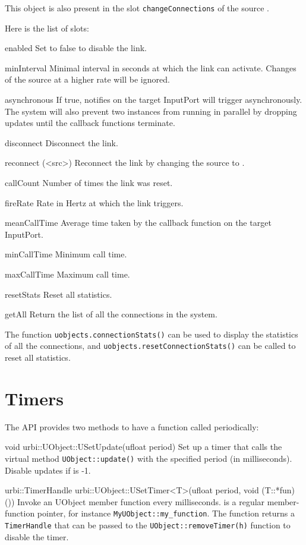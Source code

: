 This object is also present in the slot \lstinline|changeConnections| of the
source \UVar.

Here is the list of  slots:

\begin{urbiscriptapi}
\item[enabled]
  Set to false to disable the link.
\item[minInterval]
  Minimal interval in seconds at which the link can activate. Changes of the
  source at a higher rate will be ignored.
\item[asynchronous]
  If true, notifies on the target InputPort will trigger asynchronously. The
  system will also prevent two instances from running in parallel by dropping
  updates until the callback functions terminate.
\item[disconnect]
  Disconnect the link.
\item[reconnect](<src>)
  Reconnect the link by changing the source to .
\item[callCount]
  Number of times the link was reset.
\item[fireRate]
  Rate in Hertz at which the link triggers.
\item[meanCallTime]
  Average time taken by the callback function on the target InputPort.
\item[minCallTime]
  Minimum call time.
\item[maxCallTime]
  Maximum call time.
\item[resetStats]
  Reset all statistics.
\item[getAll]
  Return the list of all the connections in the system.
\end{urbiscriptapi}


The function \lstinline|uobjects.connectionStats()| can be used to display
the statistics of all the connections, and
\lstinline|uobjects.resetConnectionStats()| can be called to reset all
statistics.

\section{Timers}
\label{sec:uob:timers}

The API provides two methods to have a function called periodically:
\begin{cxxapi}
\item[void urbi::UObject::USetUpdate(ufloat period)] Set up a timer that
  calls the virtual method \lstinline{UObject::update()} with the specified
  period (in milliseconds).  Disable updates if  is -1.

\item[urbi::TimerHandle urbi::UObject::USetTimer<T>(ufloat period, void (T::*fun)())]
  Invoke an UObject member function  every 
  milliseconds.   is a regular member-function pointer, for
  instance \lstinline|MyUObject::my_function|.
  The function returns a \lstinline|TimerHandle| that can be passed to the
  \lstinline|UObject::removeTimer(h)| function to disable the timer.
\end{cxxapi}

